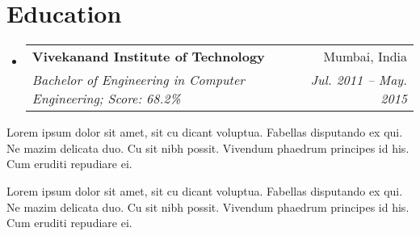 \documentclass[letterpaper,11pt]{article}
\makeatletter
\newcommand{\resumeSubheading}[4]{
  \vspace{-1pt}\item
    \begin{tabular*}{0.97\textwidth}{l@{\extracolsep{\fill}}r}
      \textbf{#1} & #2 \\
      \textit{\small#3} & \textit{\small #4} \\
    \end{tabular*}\vspace{-5pt}
}
\newcommand{\resumeSubHeadingListStart}{\begin{itemize}[leftmargin=*]}
\newcommand{\resumeSubHeadingListEnd}{\end{itemize}}
\makeatother
\begin{document}
\section{Education}
  \resumeSubHeadingListStart
    \resumeSubheading
      {Vivekanand Institute of Technology}{Mumbai, India}
      {Bachelor of Engineering in Computer Engineering;  Score: 68.2\%}{Jul. 2011 -- May. 2015}
  \resumeSubHeadingListEnd



Lorem ipsum dolor sit amet, sit cu dicant voluptua. Fabellas disputando ex qui. Ne mazim delicata duo. Cu sit nibh possit. Vivendum phaedrum principes id his. Cum eruditi repudiare ei.

Lorem ipsum dolor sit amet, sit cu dicant voluptua. Fabellas disputando ex qui. Ne mazim delicata duo. Cu sit nibh possit. Vivendum phaedrum principes id his. Cum eruditi repudiare ei.

\end{document}
